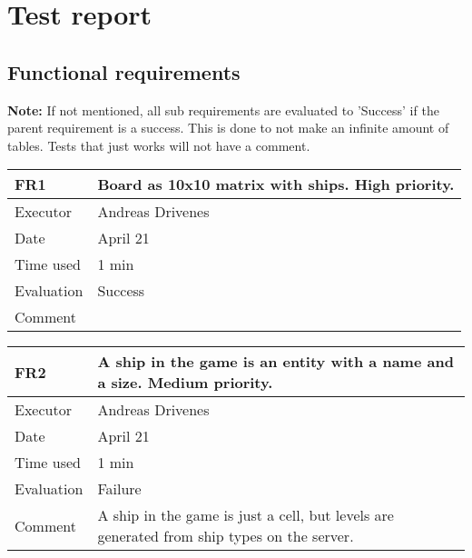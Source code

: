 \section{Test report}

\subsection{Functional requirements}

\textbf{Note:} If not mentioned, all sub requirements are evaluated to 'Success' if the parent requirement is a success. This is done to not make an infinite amount of tables. Tests that just works will not have a comment. 

\begin{table}[H]
\begin{tabular}{|l|p{10cm}|}
\hline
\textbf{FR1} & Board as 10x10 matrix with ships. High priority. \\ \hline
Executor    & Andreas Drivenes            \\ \hline
Date        & April 21            \\ \hline
Time used   & 1 min            \\ \hline
Evaluation  & Success            \\ \hline
Comment     &             \\ \hline
\end{tabular}
\end{table}

\begin{table}[H]
\begin{tabular}{|l|p{10cm}|}
\hline
\textbf{FR2} & A ship in the game is an entity with a name and a size. Medium priority.  \\ \hline
Executor    & Andreas Drivenes            \\ \hline
Date        & April 21            \\ \hline
Time used   & 1 min            \\ \hline
Evaluation  & Failure            \\ \hline
Comment     & A ship in the game is just a cell, but levels are generated from ship types on the server.            \\ \hline
\end{tabular}
\end{table}

